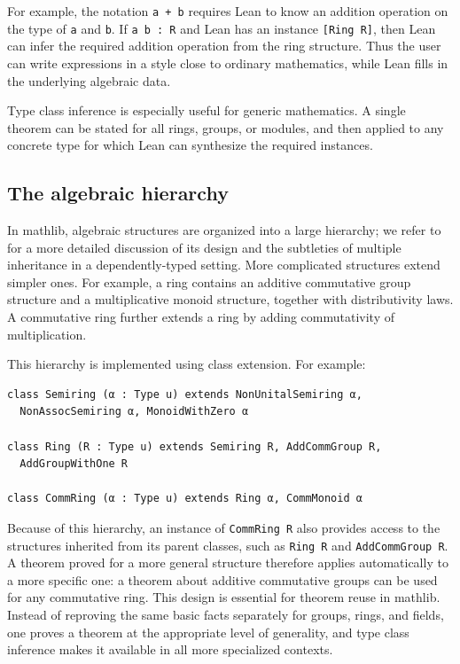 For example, the notation \lstinline|a + b| requires Lean to know an
addition operation on the type of \lstinline|a| and \lstinline|b|.  If
\lstinline|a b : R| and Lean has an instance \lstinline|[Ring R]|, then
Lean can infer the required addition operation from the ring structure.
Thus the user can write expressions in a style close to ordinary
mathematics, while Lean fills in the underlying algebraic data.

Type class inference is especially useful for generic mathematics.  A
single theorem can be stated for all rings, groups, or modules, and then
applied to any concrete type for which Lean can synthesize the required
instances.

\subsection{The algebraic hierarchy}

In \textsf{mathlib}, algebraic structures are organized into a large
hierarchy; we refer to~\cite{wieser2023multiple} for a more detailed
discussion of its design and the subtleties of multiple inheritance in
a dependently-typed setting.  More complicated structures extend simpler ones.  For example,
a ring contains an additive commutative group structure and a
multiplicative monoid structure, together with distributivity laws.
A commutative ring further extends a ring by adding commutativity of
multiplication.

This hierarchy is implemented using class extension.  For example:
\begin{lstlisting}
class Semiring (α : Type u) extends NonUnitalSemiring α,
  NonAssocSemiring α, MonoidWithZero α

class Ring (R : Type u) extends Semiring R, AddCommGroup R,
  AddGroupWithOne R

class CommRing (α : Type u) extends Ring α, CommMonoid α
\end{lstlisting}

Because of this hierarchy, an instance of \lstinline|CommRing R| also
provides access to the structures inherited from its parent classes, such
as \lstinline|Ring R| and \lstinline|AddCommGroup R|.  A theorem proved for
a more general structure therefore applies automatically to a more specific
one: a theorem about additive commutative groups can be used for any
commutative ring.  This design is essential for theorem reuse in mathlib.
Instead of reproving the same basic facts separately for groups, rings, and
fields, one proves a theorem at the appropriate level of generality, and
type class inference makes it available in all more specialized contexts.